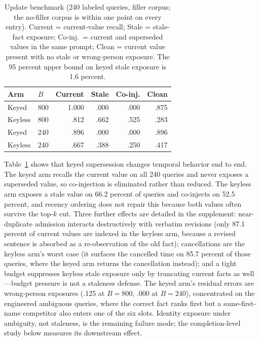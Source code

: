 \documentclass[letterpaper]{article} %
\begin{document}
\begin{table}[t]
\centering
\small
\begin{tabular}{@{}llrrrr@{}}
\toprule
Arm & $B$ & Current & Stale & Co-inj. & Clean \\
\midrule
Keyed   & 800 & 1.000 & .000 & .000 & .875 \\
Keyless & 800 & .812  & .662 & .525 & .283 \\
Keyed   & 240 & .896  & .000 & .000 & .896 \\
Keyless & 240 & .667  & .388 & .250 & .417 \\
\bottomrule
\end{tabular}
\caption{Update benchmark (240 labeled queries, filler corpus; the no-filler corpus is within one point on every entry). Current = current-value recall; Stale = stale-fact exposure; Co-inj.\ = current and superseded values in the same prompt; Clean = current value present with no stale or wrong-person exposure. The 95 percent upper bound on keyed stale exposure is 1.6 percent.}
\label{tab:temporal}
\end{table}

Table~\ref{tab:temporal} shows that keyed supersession changes temporal behavior end to end. The keyed arm recalls the current value on all 240 queries and never exposes a superseded value, so co-injection is eliminated rather than reduced. The keyless arm exposes a stale value on 66.2 percent of queries and co-injects on 52.5 percent, and recency ordering does not repair this because both values often survive the top-$k$ cut. Three further effects are detailed in the supplement: near-duplicate admission interacts destructively with verbatim revisions (only 87.1 percent of current values are indexed in the keyless arm, because a revised sentence is absorbed as a re-observation of the old fact); cancellations are the keyless arm's worst case (it surfaces the cancelled time on 85.7 percent of those queries, where the keyed arm returns the cancellation instead); and a tight budget suppresses keyless stale exposure only by truncating current facts as well---budget pressure is not a staleness defense. The keyed arm's residual errors are wrong-person exposures (.125 at $B{=}800$, .000 at $B{=}240$), concentrated on the engineered ambiguous queries, where the correct fact ranks first but a same-first-name competitor also enters one of the six slots. Identity exposure under ambiguity, not staleness, is the remaining failure mode; the completion-level study below measures its downstream effect.
\end{document}
